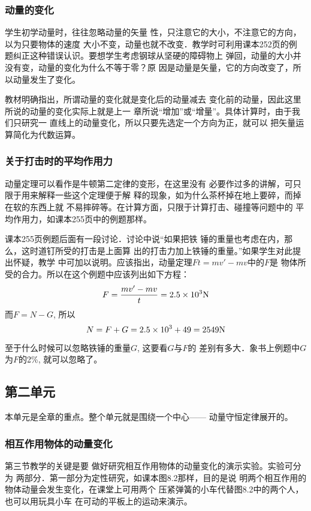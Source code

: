 \subsubsection{动量的变化}

学生初学动量时，往往忽略动量的矢量
性，只注意它的大小，不注意它的方向，以为只要物体的速度
大小不变，动量也就不改变．教学时可利用课本252页的例
题纠正这种错误认识。要想学生考虑钢球从坚硬的障碍物上
弹回，动量的大小并没有变，动量的变化为什么不等于零？原
因是动量是矢量，它的方向改变了，所以动量发生了变化。

教材明确指出，所谓动量的变化就是变化后的动量减去
变化前的动量，因此这里所说的动量的变化实际上就是上一
章所说“增加”或“增量”。具体计算时，由于我们只研究一
直线上的动量变化，所以只要先选定一个方向为正，就可以
把矢量运算简化为代数运算。

\subsubsection{关于打击时的平均作用力}
动量定理可以看作是牛顿第二定律的变形，在这里没有
必要作过多的讲解，可只限于用来解释一些这个定理便于解
释的现象，如为什么茶杯掉在地上要碎，而掉在软的东西上就
不易摔碎等。在计算方面，只限于计算打击、碰撞等问题中的
平均作用力，如课本255页中的例题那样。

课本255页例题后面有一段讨论．讨论中说“如果把铁
锤的重量也考虑在内，那么，这时道钉所受的打击是上面算
出的打击力加上铁锤的重量。”如果学生对此提出怀疑，教学
中可加以说明。应该指出，动量定理$Ft=mv'-mv$中的$F$是
物体所受的合力。所以在这个例题中应该列出如下方程：
\[F=\frac{mv'-mv}{t}=2.5\times10^3{\rm N}\]
而$F=N-G$, 所以
\[N=F+G=2.5\times10^3+49=2549{\rm N}\]

至于什么时候可以忽略铁锤的重量$G$, 这要看$G$与$F$的
差别有多大．象书上例题中$G$为$F$的2\%, 就可以忽略了。

\subsection{第二单元}
本单元是全章的重点。整个单元就是围绕一个中心——
动量守恒定律展开的。

\subsubsection{相互作用物体的动量变化}

第三节教学的关键是要
做好研究相互作用物体的动量变化的演示实验。实验可分为
两部分．第一部分为定性研究，如课本图8.2那样，目的是说
明两个相互作用的物体动量会发生变化，在课堂上可用两个
压紧弹簧的小车代替图8.2中的两个人，也可以用玩具小车
在可动的平板上的运动来演示。

